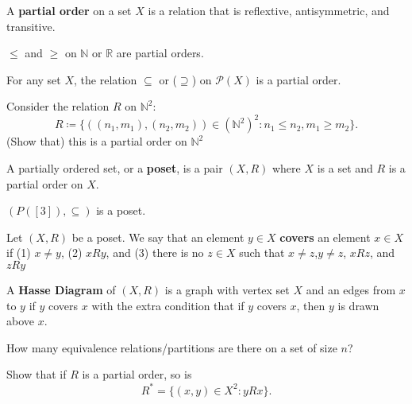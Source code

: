 \documentclass[a4paper]{article}
\begin{document}
\begin{definition}
	A \textbf{partial order} on a set \( X \) is a relation that is reflextive, antisymmetric, and transitive.
\end{definition}

\begin{eg}
	\( \le  \) and \( \ge  \) on \( \mathbb{N} \) or \( \mathbb{R} \) are partial orders.
\end{eg}

\begin{eg}
	For any set \( X \), the relation \( \subseteq \) or (\( \supseteq \)) on \( \mathcal{P}(X) \) is a partial order.
\end{eg}

\begin{eg}
	Consider the relation \( R \) on \( \mathbb{N}^2 \): \[
		R \coloneq \{((n_{1},m_{1}),(n_{2},m_{2})) \in (\mathbb{N}^2)^2 \colon n_{1} \le  n_{2}, m_{1} \ge  m_{2}\}
	.\] (Show that) this is a partial order on \( \mathbb{N}^2 \)
\end{eg}

\begin{definition}
	A partially ordered set, or a \textbf{poset}, is a pair \( (X,R) \) where \( X  \) is a set and \( R \) is a partial order on \( X \).
\end{definition}

\begin{eg}
	\( (P([3]),\subseteq) \) is a poset.
\end{eg}

\begin{definition}
	Let \( (X,R) \) be a poset. We say that an element \( y \in X \) \textbf{covers} an element \( x \in X \) if (1) \( x\neq y \), (2) \( xRy \), and (3) there is no \( z \in X \) such that \( x\neq z \),\( y\neq z \), \( xRz \), and \( zRy \)
\end{definition}

\begin{definition}
	A \textbf{Hasse Diagram} of \( (X,R) \) is a graph with vertex set \( X \) and an edges from \( x \) to \( y \) if \( y \) covers \( x \) with the extra condition that if \( y \) covers \( x \), then \( y  \) is drawn above \( x \).
\end{definition}

How many equivalence relations/partitions are there on a set of size \( n \)?

Show that if \( R \) is a partial order, so is \[
	R^* = \{(x,y) \in X^2 \colon yRx \} 
.\] 
\end{document}

